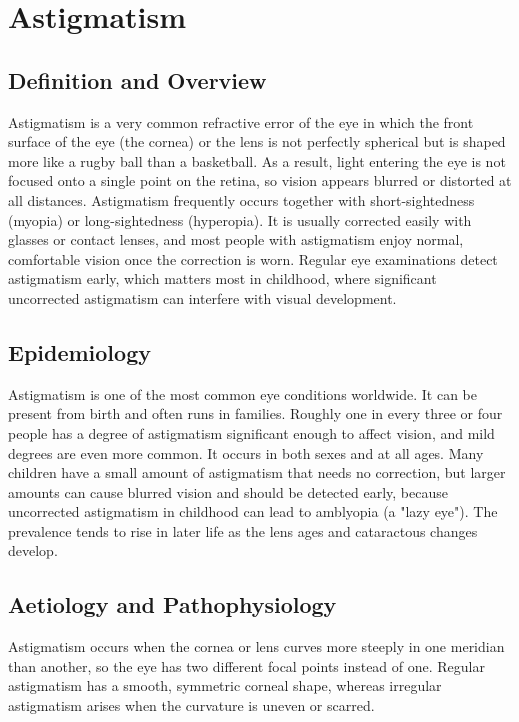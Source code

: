 \chapter{Astigmatism}

\section*{Definition and Overview}
Astigmatism is a very common refractive error of the eye in which the front surface of the eye (the cornea) or the lens is not perfectly spherical but is shaped more like a rugby ball than a basketball. As a result, light entering the eye is not focused onto a single point on the retina, so vision appears blurred or distorted at all distances. Astigmatism frequently occurs together with short-sightedness (myopia) or long-sightedness (hyperopia). It is usually corrected easily with glasses or contact lenses, and most people with astigmatism enjoy normal, comfortable vision once the correction is worn. Regular eye examinations detect astigmatism early, which matters most in childhood, where significant uncorrected astigmatism can interfere with visual development.

\section*{Epidemiology}
Astigmatism is one of the most common eye conditions worldwide. It can be present from birth and often runs in families. Roughly one in every three or four people has a degree of astigmatism significant enough to affect vision, and mild degrees are even more common. It occurs in both sexes and at all ages. Many children have a small amount of astigmatism that needs no correction, but larger amounts can cause blurred vision and should be detected early, because uncorrected astigmatism in childhood can lead to amblyopia (a "lazy eye"). The prevalence tends to rise in later life as the lens ages and cataractous changes develop.

\section*{Aetiology and Pathophysiology}
Astigmatism occurs when the cornea or lens curves more steeply in one meridian than another, so the eye has two different focal points instead of one. Regular astigmatism has a smooth, symmetric corneal shape, whereas irregular astigmatism arises when the curvature is uneven or scarred.

